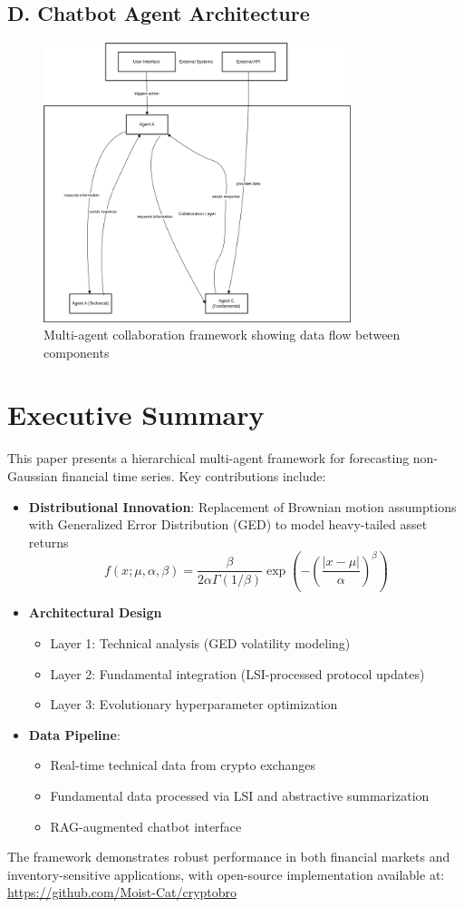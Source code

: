 \documentclass[12pt]{article}
\begin{document}
\subsection*{D. Chatbot Agent Architecture}
\begin{figure}[H]
\centering
\includegraphics[width=0.8\textwidth]{chatbot_architecture.png}
\caption{Multi-agent collaboration framework showing data flow between components}
\label{fig:chatbot_arch}
\end{figure}

\section*{Executive Summary}
This paper presents a hierarchical multi-agent framework for forecasting non-Gaussian financial time series. Key contributions include:

\begin{itemize}
\item \textbf{Distributional Innovation}: Replacement of Brownian motion assumptions with Generalized Error Distribution (GED) to model heavy-tailed asset returns
\[
f(x; \mu, \alpha, \beta) = \frac{\beta}{2\alpha\Gamma(1/\beta)} \exp\left(-\left(\frac{|x-\mu|}{\alpha}\right)^\beta\right)
\]
\item \textbf{Architectural Design}
    \begin{itemize}
    \item Layer 1: Technical analysis (GED volatility modeling)
    \item Layer 2: Fundamental integration (LSI-processed protocol updates)
    \item Layer 3: Evolutionary hyperparameter optimization
    \end{itemize}

\item \textbf{Data Pipeline}:
    \begin{itemize}
    \item Real-time technical data from crypto exchanges
    \item Fundamental data processed via LSI and abstractive summarization
    \item RAG-augmented chatbot interface
    \end{itemize}
\end{itemize}

The framework demonstrates robust performance in both financial markets and inventory-sensitive applications, with open-source implementation available at: \url{https://github.com/Moist-Cat/cryptobro}
\end{document}
